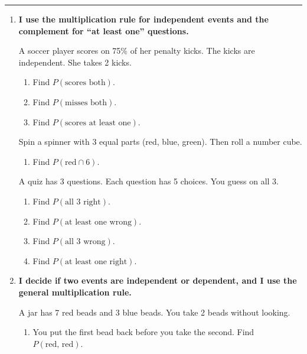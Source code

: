 \documentclass[11pt]{article}
\newcommand{\lessonhead}[1]{\par\vspace{0.6em}{\large\bfseries #1}\par\vspace{0.25em}\hrule\vspace{0.6em}}
\newcommand{\goal}[1]{\textbf{#1}\par\vspace{0.35em}}
\begin{document}
\newpage
\lessonhead{6.2 - The Multiplication Rule}
\begin{enumerate}[resume]

\item \goal{I use the multiplication rule for independent events and the complement for ``at least one'' questions.}
A soccer player scores on 75\% of her penalty kicks. The kicks are independent. She takes 2 kicks.
\begin{enumerate}
  \item Find $P(\text{scores both})$. 
  \work{3.2em}
  \item Find $P(\text{misses both})$. 
  \work{3.2em}
  \item Find $P(\text{scores at least one})$. 
  \work{3.2em}
\end{enumerate}

\vspace{0.4em}
Spin a spinner with 3 equal parts (red, blue, green). Then roll a number cube.
\begin{enumerate}[start=4]
  \item Find $P(\text{red} \cap 6)$. 
  \work{3.2em}
\end{enumerate}

\vspace{0.4em}
A quiz has 3 questions. Each question has 5 choices. You guess on all 3.
\begin{enumerate}[start=5]
  \item Find $P(\text{all 3 right})$. 
  \work{3.2em}
  \item Find $P(\text{at least one wrong})$. 
  \work{3.2em}
  \item Find $P(\text{all 3 wrong})$. 
  \work{3.2em}
  \item Find $P(\text{at least one right})$. 
  \work{3.2em}
\end{enumerate}

\newpage
\item \goal{I decide if two events are independent or dependent, and I use the general multiplication rule.}
A jar has 7 red beads and 3 blue beads. You take 2 beads without looking.
\begin{enumerate}
  \item You put the first bead back before you take the second. Find $P(\text{red, red})$.


\end{enumerate}
\end{enumerate}
\end{document}

